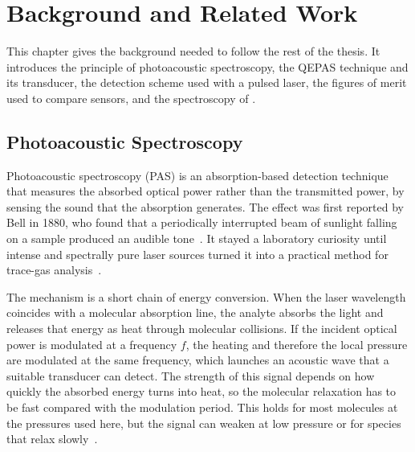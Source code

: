 \chapter{Background and Related Work}
\label{ch:background}

This chapter gives the background needed to follow the rest of the thesis. It introduces the principle of photoacoustic spectroscopy, the QEPAS technique and its transducer, the detection scheme used with a pulsed laser, the figures of merit used to compare sensors, and the spectroscopy of \nto.

\section{Photoacoustic Spectroscopy}
\label{sec:pas}

Photoacoustic spectroscopy (PAS) is an absorption-based detection technique that measures the absorbed optical power rather than the transmitted power, by sensing the sound that the absorption generates. The effect was first reported by Bell in 1880, who found that a periodically interrupted beam of sunlight falling on a sample produced an audible tone~\cite{Bell1880}. It stayed a laboratory curiosity until intense and spectrally pure laser sources turned it into a practical method for trace-gas analysis~\cite{miklos2001}.

The mechanism is a short chain of energy conversion. When the laser wavelength coincides with a molecular absorption line, the analyte absorbs the light and releases that energy as heat through molecular collisions. If the incident optical power is modulated at a frequency $f$, the heating and therefore the local pressure are modulated at the same frequency, which launches an acoustic wave that a suitable transducer can detect. The strength of this signal depends on how quickly the absorbed energy turns into heat, so the molecular relaxation has to be fast compared with the modulation period. This holds for most molecules at the pressures used here, but the signal can weaken at low pressure or for species that relax slowly~.

